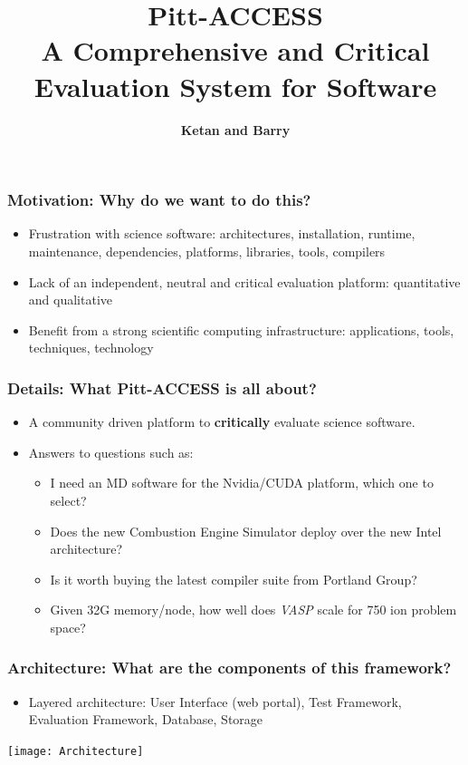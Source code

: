 \documentclass[hyperref={pdfpagelabels=false},12pt]{beamer}
\title[Pitt Access]{{\large Pitt-ACCESS\\ A Comprehensive and Critical Evaluation System for Software}}
\author[Pitt-Access]{{\scriptsize \textbf{Ketan and Barry}}}
\date{}
\begin{document}
\begin{frame}[plain]
\titlepage
\end{frame}

\begin{frame}
\frametitle{Motivation: Why do we want to do this?}
\begin{itemize}
\itemsep1em
\item 
Frustration with science software: architectures, installation, runtime, maintenance, dependencies, platforms, libraries, tools, compilers
\item 
Lack of an independent, neutral and critical evaluation platform: quantitative and qualitative
\item 
Benefit from a strong scientific computing infrastructure: applications, tools, techniques, technology
\end{itemize}
\end{frame}

\begin{frame}
\frametitle{Details: What Pitt-ACCESS is all about?}
\begin{itemize}
\itemsep1em
\item 
A community driven platform to \textbf{critically} evaluate science software.
\item 
Answers to questions such as:
\begin{itemize}
\item 
I need an MD software for the Nvidia/CUDA platform, which one to select?
\item 
Does the new Combustion Engine Simulator deploy over the new Intel architecture?
\item 
Is it worth buying the latest compiler suite from Portland Group?
\item 
Given 32G memory/node, how well does \textit{VASP} scale for 750 ion problem space?
\end{itemize}
\end{itemize}

\end{frame}

\begin{frame}
\frametitle{Architecture: What are the components of this framework?}
\begin{itemize}
\item 
Layered architecture: User Interface (web portal), Test Framework, Evaluation Framework, Database, Storage
\end{itemize}
\texttt{[image: Architecture]}
\end{frame}
\end{document}
